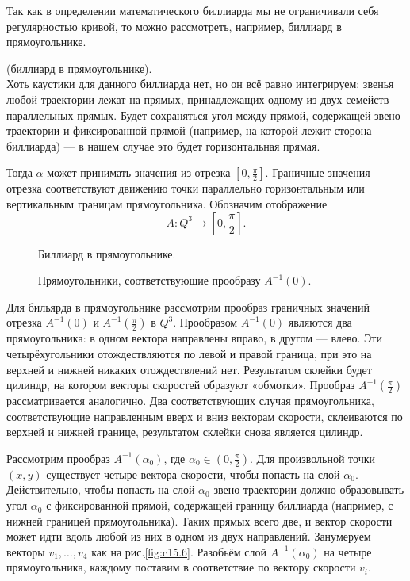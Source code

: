 Так как в определении математического биллиарда мы не ограничивали себя регулярностью кривой, то можно рассмотреть, например, биллиард в прямоугольнике.
\begin{example}(биллиард в прямоугольнике).\\
    Хоть каустики для данного биллиарда нет, но он всё равно интегрируем: звенья любой траектории лежат на прямых, принадлежащих одному из двух семейств параллельных прямых. Будет сохраняться угол между прямой, содержащей звено траектории и фиксированной прямой (например, на которой лежит сторона биллиарда) — в нашем случае это будет горизонтальная прямая.

    Тогда $\alpha$ может принимать значения из отрезка $[0, \frac{\pi}{2}]$. Граничные значения отрезка соответствуют движению точки параллельно горизонтальным или вертикальным границам прямоугольника. Обозначим отображение
    \[A: Q^3 \to \left[0, \frac{\pi}{2}\right].\]

    \begin{figure}[ht]
        \centering
        \caption{Биллиард в прямоугольнике.}
        \label{fig:c15.4}
    \end{figure}

    \begin{figure}[ht]
        \centering
        \caption{Прямоугольники, соответствующие прообразу $A^{-1}(0).$}
        \label{fig:c15.5}
    \end{figure}

    Для бильярда в прямоугольнике рассмотрим прообраз граничных значений отрезка $A^{-1}(0)$ и $A^{-1}(\frac{\pi}{2})$ в $Q^3$. Прообразом $A^{-1}(0)$ являются два прямоугольника: в одном вектора направлены вправо, в другом — влево. Эти четырёхугольники отождествляются по левой и правой граница, при это на верхней и нижней никаких отождествлений нет. Результатом склейки будет цилиндр, на котором векторы скоростей образуют «обмотки». Прообраз $A^{-1}(\frac{\pi}{2})$ рассматривается аналогично. Два соответствующих случая прямоугольника, соответствующие направленным вверх и вниз векторам скорости, склеиваются по верхней и нижней границе, результатом склейки снова является цилиндр.

    Рассмотрим прообраз $A^{-1}(\alpha_0)$, где $\alpha_0 \in \left(0, \frac{\pi}{2}\right)$. Для произвольной точки $(x,y)$ существует четыре вектора скорости, чтобы попасть на слой $\alpha_0$. Действительно, чтобы попасть на слой $\alpha_0$ звено траектории должно образовывать угол $\alpha_0$ с фиксированной прямой, содержащей границу биллиарда (например, с нижней границей прямоугольника). Таких прямых всего две, и вектор скорости может идти вдоль любой из них в одном из двух направлений. Занумеруем векторы $v_1, \dots, v_4$ как на рис.\ref{fig:c15.6}. Разобьём слой $A^{-1}(\alpha_0)$ на четыре прямоугольника, каждому поставим в соответствие по вектору скорости $v_i$.


\end{example}
